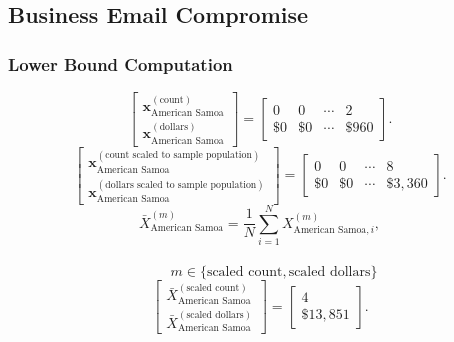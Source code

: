 \newpage
\subsection{Business Email Compromise}
\subsubsection{Lower Bound Computation}
\[
\begin{bmatrix}
\mathbf{x}_{\text{American Samoa}}^{(\text{count})}\\
\mathbf{x}_{\text{American Samoa}}^{(\text{dollars})}
\end{bmatrix}
=
\begin{bmatrix}
0 & 0 & \cdots & 2\\
\$0 &\$0 & \cdots &\$960 
\end{bmatrix}.
\]
\[
\begin{bmatrix}
\mathbf{x}_{\text{American Samoa}}^{(\text{count scaled to sample population})}\\
\mathbf{x}_{\text{American Samoa}}^{(\text{dollars scaled to sample population})}
\end{bmatrix}
=
\begin{bmatrix}
0 & 0 & \cdots & 8\\
\$0 & \$0 & \cdots &\$3{,}360
\end{bmatrix}.
\]
  \[
\bar{X}_{\text{American Samoa}}^{(m)}
= \frac{1}{N}\sum_{i=1}^{N} X_{\text{American Samoa},i}^{(m)},
\]
\\
\[
\qquad
m \in \{\text{scaled count},\text{scaled dollars}\}
\]
\[
\begin{bmatrix}
\bar{X}_{\text{American Samoa}}^{(\text{scaled count})}\\
\bar{X}_{\text{American Samoa}}^{(\text{scaled dollars})}
\end{bmatrix}
=
\begin{bmatrix}
4\\
\$13{,}851
\end{bmatrix}.
\]
